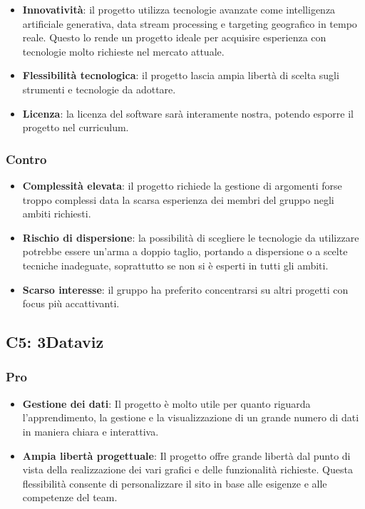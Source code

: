 \begin{itemize}
    \item \textbf{Innovatività}: il progetto utilizza tecnologie avanzate come intelligenza artificiale generativa, data stream processing e targeting geografico in tempo reale. Questo lo rende un progetto ideale per acquisire esperienza con tecnologie molto richieste nel mercato attuale.
    \item \textbf{Flessibilità tecnologica}: il progetto lascia ampia libertà di scelta sugli strumenti e tecnologie da adottare.
    \item \textbf{Licenza}: la licenza del software sarà interamente nostra, potendo esporre il progetto nel curriculum.
\end{itemize}

\subsubsection{Contro}

\begin{itemize}
    \item \textbf{Complessità elevata}: il progetto richiede la gestione di argomenti forse troppo complessi data la scarsa esperienza dei membri del gruppo negli ambiti richiesti.
    \item \textbf{Rischio di dispersione}: la possibilità di scegliere le tecnologie da utilizzare potrebbe essere un'arma a doppio taglio, portando a dispersione o a scelte tecniche inadeguate, soprattutto se non si è esperti in tutti gli ambiti.
    \item \textbf{Scarso interesse}: il gruppo ha preferito concentrarsi su altri progetti con focus più accattivanti.
\end{itemize}


\subsection{C5:	3Dataviz}

\subsubsection{Pro}

\begin{itemize}
    \item \textbf{Gestione dei dati}: Il progetto è molto utile per quanto riguarda l’apprendimento, la gestione e la visualizzazione di un grande numero di dati in maniera chiara e interattiva.
    \item \textbf{Ampia libertà progettuale}: Il progetto offre grande libertà dal punto di vista della realizzazione dei vari grafici e delle funzionalità richieste. Questa flessibilità consente di personalizzare il sito in base alle esigenze e alle competenze del team.
\end{itemize}

